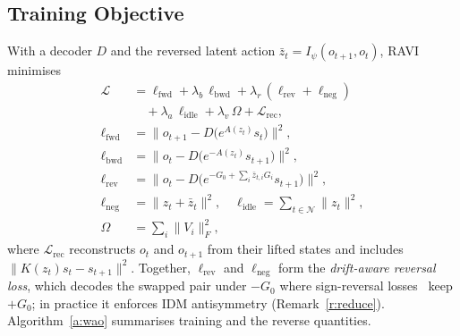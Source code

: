 \documentclass{jcse}
\newcommand{\method}{RAVI}
\newcommand{\zb}{\bar{z}}
\begin{document}
\subsection{Training Objective}
With a decoder $D$ and the reversed latent action $\zb_t=I_\psi(o_{t+1},o_t)$, {\method} minimises
\begin{align}
\mathcal{L}&=\ell_{\mathrm{fwd}}+\lambda_b\,\ell_{\mathrm{bwd}}+\lambda_r\,(\ell_{\mathrm{rev}}+\ell_{\mathrm{neg}})\nonumber\\
&\quad+\lambda_a\,\ell_{\mathrm{idle}}+\lambda_v\,\Omega+\mathcal{L}_{\mathrm{rec}},\nonumber\\
\ell_{\mathrm{fwd}}&=\big\|o_{t+1}-D\big(e^{A(z_t)}s_t\big)\big\|^2,\nonumber\\
\ell_{\mathrm{bwd}}&=\big\|o_t-D\big(e^{-A(z_t)}s_{t+1}\big)\big\|^2,\nonumber\\
\ell_{\mathrm{rev}}&=\big\|o_t-D\big(e^{-G_0+\sum_i\zb_{t,i}G_i}s_{t+1}\big)\big\|^2,\nonumber\\
\ell_{\mathrm{neg}}&=\|z_t+\zb_t\|^2,\quad \ell_{\mathrm{idle}}=\textstyle\sum_{t\in\mathcal{N}}\|z_t\|^2,\nonumber\\
\Omega&=\textstyle\sum_i\|V_i\|_F^2,
\label{e:loss}
\end{align}
where $\mathcal{L}_{\mathrm{rec}}$ reconstructs $o_t$ and $o_{t+1}$ from their lifted states and includes $\|K(z_t)s_t-s_{t+1}\|^2$.
Together, $\ell_{\mathrm{rev}}$ and $\ell_{\mathrm{neg}}$ form the \emph{drift-aware reversal loss}, which decodes the swapped pair under $-G_0$ where sign-reversal losses~\cite{tang2026alam} keep $+G_0$; in practice it enforces IDM antisymmetry (Remark~\ref{r:reduce}). Algorithm~\ref{a:wao} summarises training and the reverse quantities.
\end{document}
